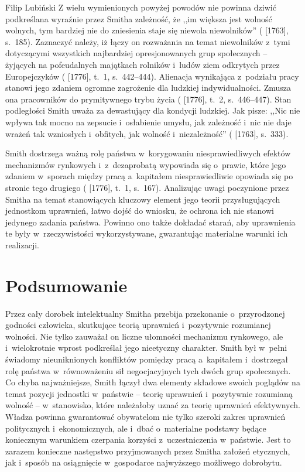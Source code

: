 \begin{artplenv}{Filip Lubiński}
Z wielu wymienionych powyżej powodów nie powinna dziwić podkreślana wyraźnie przez Smitha zależność, że ,,im większa
jest wolność wolnych, tym bardziej nie do zniesienia staje się niewola niewolników''
(\cite{smith_lectures_1982} [1763], s.~185).
Zaznaczyć należy, iż łączy on rozważania na temat niewolników z~tymi dotyczącymi wszystkich
najbardziej opresjonowanych grup społecznych -- żyjących na pofeudalnych majątkach rolników i~ludów ziem odkrytych przez
Europejczyków
(\cite{smith_badania_2007} [1776], t.~1, s.~442--444).
Alienacja wynikająca z~podziału pracy
stanowi jego zdaniem ogromne zagrożenie dla ludzkiej indywidualności. Zmusza ona pracowników do prymitywnego trybu
życia
(\cite{smith_badania_2007} [1776], t.~2, s.~446--447).
Stan podległości Smith uważa za dewastujący dla
kondycji ludzkiej. Jak pisze: ,,Nic nie wpływa tak mocno na zepsucie i~osłabienie umysłu, jak zależność i~nic nie daje
wrażeń tak wzniosłych i~obfitych, jak wolność i~niezależność''
(\cite{smith_lectures_1982} [1763], s.~333).

Smith dostrzega ważną rolę państwa w~korygowaniu niesprawiedliwych efektów mechanizmów rynkowych i~z~dezaprobatą
wypowiada się o~prawie, które jego zdaniem w~sporach między pracą a~kapitałem niesprawiedliwie opowiada się po stronie
tego drugiego
(\cite{smith_badania_2007} [1776], t.~1, s.~167).
Analizując uwagi poczynione przez Smitha na
temat stanowiących kluczowy element jego teorii przysługujących jednostkom uprawnień, łatwo dojść do wniosku, że ochrona
ich nie stanowi jedynego zadania państwa. Powinno ono także dokładać starań, aby uprawnienia te były w~rzeczywistości
wykorzystywane, gwarantując materialne warunki ich realizacji.

\section*{Podsumowanie}
Przez cały dorobek intelektualny Smitha przebija przekonanie o~przyrodzonej godności człowieka, skutkujące teorią
uprawnień i~pozytywnie rozumianej wolności. Nie tylko zauważał on liczne ułomności mechanizmu rynkowego,
ale i~wielokrotnie wprost podkreślał jego nieetyczny charakter. Smith był w~pełni świadomy nieuniknionych konfliktów pomiędzy
pracą a~kapitałem i~dostrzegał rolę państwa w~równoważeniu sił negocjacyjnych tych dwóch grup społecznych. Co chyba
najważniejsze, Smith łączył dwa elementy składowe swoich poglądów na temat pozycji jednostki w~państwie -- teorię
uprawnień i~pozytywnie rozumianą wolność -- w~stanowisko, które należałoby uznać za teorię uprawnień efektywnych. Władza
powinna gwarantować obywatelom nie tylko szeroki zakres uprawnień politycznych i~ekonomicznych, ale i~dbać o~materialne
podstawy będące koniecznym warunkiem czerpania korzyści z~uczestniczenia w~państwie. Jest to zarazem konieczne
następstwo przyjmowanych przez Smitha założeń etycznych, jak i~sposób na osiągnięcie w~gospodarce najwyższego możliwego
dobrobytu.


\end{artplenv}
